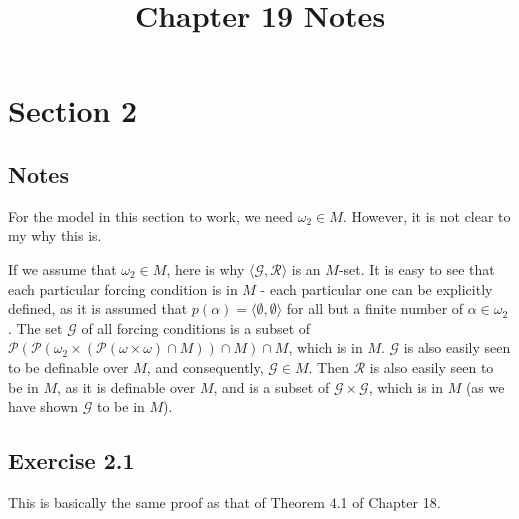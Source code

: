 \documentclass{article}
\title{Chapter 19 Notes}
\theoremstyle{definition}
\begin{document}
\date{}
\maketitle

\section*{Section 2}

\subsection*{Notes}
For the model in this section to work, we need $\omega_2\in M$. However, it is not clear to my why this is.

If we assume that $\omega_2\in M$, here is why $\langle\mathcal{G},\mathcal{R}\rangle$ is an $M$-set. It 
is easy to see that each particular forcing condition is in $M$ - each particular one can be explicitly defined, 
as it is assumed that $p(\alpha)=\langle\emptyset,\emptyset\rangle$ for all but a finite number of $\alpha\in\omega_2$. 
The set $\mathcal{G}$ of all forcing conditions is a subset of 
$\mathcal{P}(\mathcal{P}(\omega_2\times(\mathcal{P}(\omega\times\omega)\cap M))\cap M)\cap M$, which is in $M$.
$\mathcal{G}$ is also easily seen to be definable over $M$, and consequently, $\mathcal{G}\in M$. Then 
$\mathcal{R}$ is also easily seen to be in $M$, as it is definable over $M$, and is a subset of $\mathcal{G}\times\mathcal{G}$, which 
is in $M$ (as we have shown $\mathcal{G}$ to be in $M$).

\subsection*{Exercise 2.1}
This is basically the same proof as that of Theorem 4.1 of Chapter 18.
\end{document}
